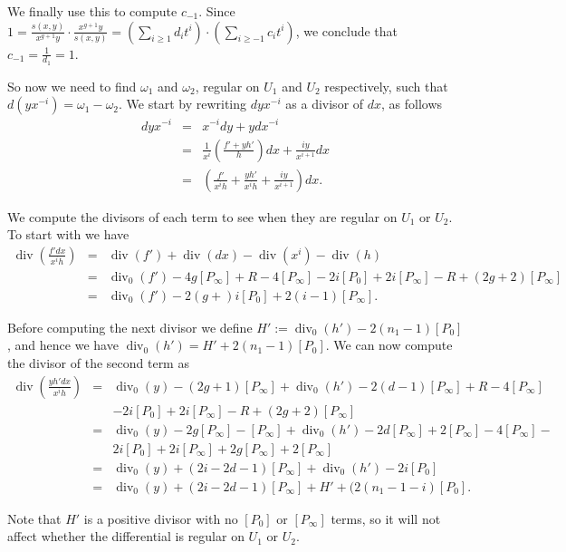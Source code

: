 \documentclass[draft, 11pt]{article} %
\theoremstyle{plain}
\theoremstyle{remark}
\DeclareMathOperator{\di}{div}
\begin{document}
We finally use this to compute $c_{-1}$.
Since $1 = \frac{s(x,y)}{x^{g+1}y}\cdot \frac{x^{g+1}y}{s(x,y)} = \left( \sum_{i\geq 1}d_it^i \right) \cdot \left( \sum_{i\geq -1}c_it^i\right)$, we conclude that $c_{-1} = \frac{1}{d_{1}} = 1$.


So now we need to find $\omega_1$ and $\omega_2$, regular on $U_1$ and $U_2$ respectively, such that $d(yx^{-i}) = \omega_1 - \omega_2$.
We start by rewriting $dyx^{-i}$ as a divisor of $dx$, as follows
\begin{eqnarray*}
dyx^{-i} & = & x^{-i}dy + ydx^{-i} \\
& = & \frac{1}{x^i} \left( \frac{f' + yh'}{h}\right) dx + \frac{iy}{x^{i+1}}dx \\
& = & \left( \frac{f'}{x^ih} + \frac{yh'}{x^ih} + \frac{iy}{x^{i+1}} \right) dx.
\end{eqnarray*}

We compute the divisors of each term to see when they are regular on $U_1$ or $U_2$.
To start with we have
\begin{eqnarray*}
\di \left( \frac{f'dx}{x^ih} \right) & = & \di (f') + \di ( dx ) - \di (x^i) - \di (h) \\
& = & \di_0 (f') - 4g[P_\infty] + R - 4[P_\infty] - 2i[P_0] + 2i[P_\infty] -R + (2g+2)[P_\infty] \\
& = & \di_0(f') - 2(g+)i[P_0] +2(i-1)[P_\infty].
\end{eqnarray*}


Before computing the next divisor we define $H' := \di_0(h') - 2(n_1 -1)[P_0]$, and hence we have $\di_0(h') = H' + 2(n_1-1)[P_0]$.
We can now compute the divisor of the second term as
\begin{eqnarray*}
\di\left( \frac{yh'dx}{x^ih} \right)  & = & \di_0(y) - (2g+1)[P_\infty] + \di_0(h') - 2(d-1)[P_\infty] + R - 4[P_\infty] \\
& & - 2i[P_0] + 2i[P_\infty] - R + (2g+2)[P_\infty] \\
& = & \di_0(y) - 2g[P_\infty] - [P_\infty] + \di_0(h') - 2d[P_\infty] + 2[P_\infty] - 4[P_\infty] -\\
& & 2i[P_0] + 2i[P_\infty]+ 2g[P_\infty] + 2[P_\infty]  \\
& = & \di_0(y) + (2i-2d-1)[P_\infty] + \di_0(h') - 2i[P_0] \\
& = & \di_0(y) + (2i -2d -1) [P_\infty] + H' + (2(n_1 - 1 - i)[P_0].
\end{eqnarray*}

Note that $H'$ is a positive  divisor with no $[P_0]$ or $[P_\infty]$ terms, so it will not affect whether the differential is regular on $U_1$ or $U_2$.
\end{document}
